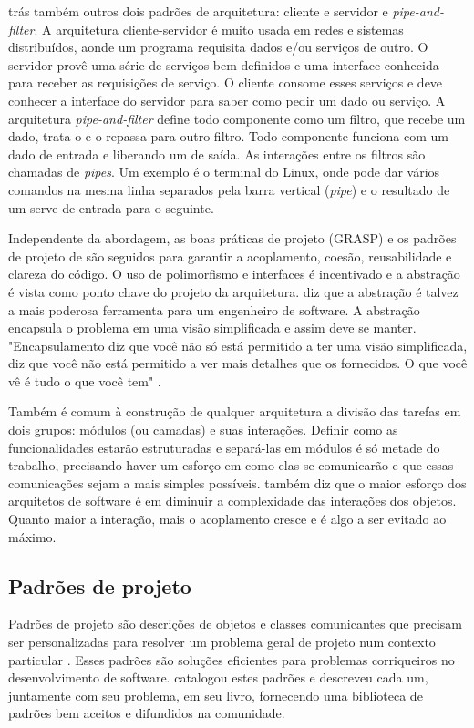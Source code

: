 \cite{Goodliffe2007} trás também outros dois padrões de arquitetura: cliente e servidor e \textit{pipe-and-filter}. A arquitetura cliente-servidor é muito usada em redes e sistemas distribuídos, aonde um programa requisita dados e/ou serviços de outro. O servidor provê uma série de serviços bem definidos e uma interface conhecida para receber as requisições de serviço. O cliente consome esses serviços e deve conhecer a interface do servidor para saber como pedir um dado ou serviço. A arquitetura \textit{pipe-and-filter} define todo componente como um filtro, que recebe um dado, trata-o e o repassa para outro filtro. Todo componente funciona com um dado de entrada e liberando um de saída. As interações entre os filtros são chamadas de \textit{pipes}. Um exemplo é o terminal do Linux, onde pode dar vários comandos na mesma linha separados pela barra vertical (\textit{pipe}) e o resultado de um serve de entrada para o seguinte.

Independente da abordagem, as boas práticas de projeto (GRASP) e os padrões de projeto de \cite{Gamma1995} são seguidos para garantir a acoplamento, coesão, reusabilidade e clareza do código. O uso de polimorfismo e interfaces é incentivado e a abstração é vista como ponto chave do projeto da arquitetura. \cite{Szyperski2002} diz que a abstração é talvez a mais poderosa ferramenta para um engenheiro de software. A abstração encapsula o problema em uma visão simplificada e assim deve se manter. "Encapsulamento diz que você não só está permitido a ter uma visão simplificada, diz que você não está permitido a ver mais detalhes que os fornecidos. O que você vê é tudo o que você tem" \cite{McConnel2004}.

Também é comum à construção de qualquer arquitetura a divisão das tarefas em dois grupos: módulos (ou camadas) e suas interações. Definir como as funcionalidades estarão estruturadas e separá-las em módulos é só metade do trabalho, precisando haver um esforço em como elas se comunicarão e que essas comunicações sejam a mais simples possíveis. \cite{Szyperski2002} também diz que o maior esforço dos arquitetos de software é em diminuir a complexidade das interações dos objetos. Quanto maior a interação, mais o acoplamento cresce e é algo a ser evitado ao máximo.

\subsection{Padrões de projeto}

Padrões de projeto são descrições de objetos e classes comunicantes que precisam ser personalizadas para resolver um problema geral de projeto num contexto particular \cite{Gamma1995}. Esses padrões são soluções eficientes para problemas corriqueiros no desenvolvimento de software. \cite{Gamma1995} catalogou estes padrões e descreveu cada um, juntamente com seu problema, em seu livro, fornecendo uma biblioteca de padrões bem aceitos e difundidos na comunidade.

